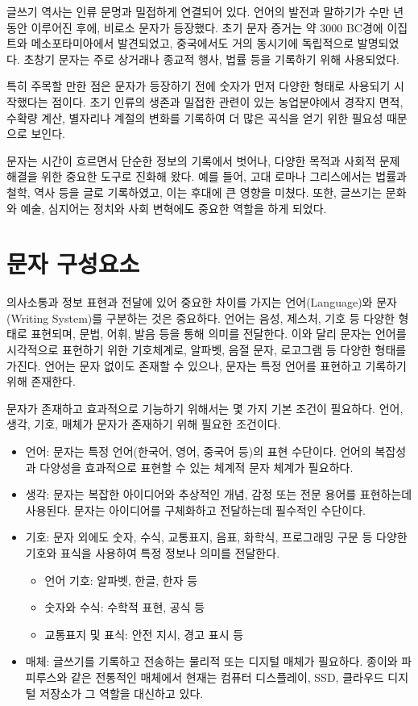\documentclass[
  letterpaper,
]{book}
\providecommand{\tightlist}{%
  \setlength{\itemsep}{0pt}\setlength{\parskip}{0pt}}\usepackage{longtable,booktabs,array}
\begin{document}
글쓰기 역사는 인류 문명과 밀접하게 연결되어 있다. 언어의 발전과 말하기가
수만 년 동안 이루어진 후에, 비로소 문자가 등장했다. 초기 문자 증거는 약
3000 BC경에 이집트와 메소포타미아에서 발견되었고, 중국에서도 거의
동시기에 독립적으로 발명되었다. 초창기 문자는 주로 상거래나 종교적 행사,
법률 등을 기록하기 위해 사용되었다.

특히 주목할 만한 점은 문자가 등장하기 전에 숫자가 먼저 다양한 형태로
사용되기 시작했다는 점이다. 초기 인류의 생존과 밀접한 관련이 있는
농업분야에서 경작지 면적, 수확량 계산, 별자리나 계절의 변화를 기록하여
더 많은 곡식을 얻기 위한 필요성 때문으로 보인다.

문자는 시간이 흐르면서 단순한 정보의 기록에서 벗어나, 다양한 목적과
사회적 문제 해결을 위한 중요한 도구로 진화해 왔다. 예를 들어, 고대
로마나 그리스에서는 법률과 철학, 역사 등을 글로 기록하였고, 이는 후대에
큰 영향을 미쳤다. 또한, 글쓰기는 문화와 예술, 심지어는 정치와 사회
변혁에도 중요한 역할을 하게 되었다.

\hypertarget{uxbb38uxc790-uxad6cuxc131uxc694uxc18c}{%
\section{문자 구성요소}\label{uxbb38uxc790-uxad6cuxc131uxc694uxc18c}}

의사소통과 정보 표현과 전달에 있어 중요한 차이를 가지는 언어(Language)와
문자(Writing System)를 구분하는 것은 중요하다. 언어는 음성, 제스처, 기호
등 다양한 형태로 표현되며, 문법, 어휘, 발음 등을 통해 의미를 전달한다.
이와 달리 문자는 언어를 시각적으로 표현하기 위한 기호체계로, 알파벳,
음절 문자, 로고그램 등 다양한 형태를 가진다. 언어는 문자 없이도 존재할
수 있으나, 문자는 특정 언어를 표현하고 기록하기 위해 존재한다.

문자가 존재하고 효과적으로 기능하기 위해서는 몇 가지 기본 조건이
필요하다. 언어, 생각, 기호, 매체가 문자가 존재하기 위해 필요한 조건이다.

\begin{itemize}
\item
  언어: 문자는 특정 언어(한국어, 영어, 중국어 등)의 표현 수단이다.
  언어의 복잡성과 다양성을 효과적으로 표현할 수 있는 체계적 문자 체계가
  필요하다.
\item
  생각: 문자는 복잡한 아이디어와 추상적인 개념, 감정 또는 전문 용어를
  표현하는데 사용된다. 문자는 아이디어를 구체화하고 전달하는데 필수적인
  수단이다.
\item
  기호: 문자 외에도 숫자, 수식, 교통표지, 음표, 화학식, 프로그래밍 구문
  등 다양한 기호와 표식을 사용하여 특정 정보나 의미를 전달한다.

  \begin{itemize}
  \tightlist
  \item
    언어 기호: 알파벳, 한글, 한자 등
  \item
    숫자와 수식: 수학적 표현, 공식 등
  \item
    교통표지 및 표식: 안전 지시, 경고 표시 등
  \end{itemize}
\item
  매체: 글쓰기를 기록하고 전송하는 물리적 또는 디지털 매체가 필요하다.
  종이와 파피루스와 같은 전통적인 매체에서 현재는 컴퓨터 디스플레이,
  SSD, 클라우드 디지털 저장소가 그 역할을 대신하고 있다.
\end{itemize}
\end{document}
